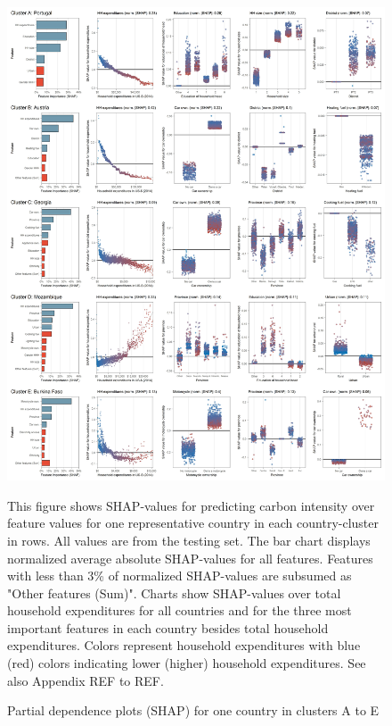 \documentclass[12pt, a4paper]{article}
\newenvironment{subcaption}
{\strut
\vspace{-5pt}
\begin{minipage}[b]{0.9\textwidth}
  \hspace*{-\parindent}
  \footnotesize}
 {\end{minipage}}
\begin{document}
\begin{figure}[ht!]
    \centering
    \includegraphics[width=15.5 cm]{Figure 5/Figures_joint_1}
    \caption{Partial dependence plots (SHAP) for one country in clusters A to E}
    \label{fig:fig_5_1}
    \begin{subcaption}
    This figure shows SHAP-values for predicting carbon intensity over feature values for one representative country in each country-cluster in rows. All values are from the testing set. The bar chart displays normalized average absolute SHAP-values for all features. Features with less than 3\% of normalized SHAP-values are subsumed as "Other features (Sum)". Charts show SHAP-values over total household expenditures for all countries and for the three most important features in each country besides total household expenditures. Colors represent household expenditures with blue (red) colors indicating lower (higher) household expenditures. See also Appendix REF to REF.
    \end{subcaption}
\end{figure}
\end{document}
